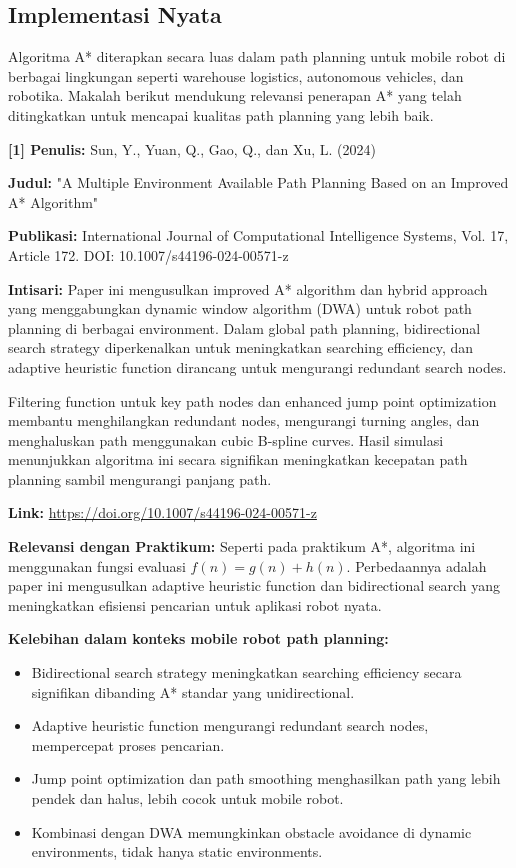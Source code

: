 \subsection{Implementasi Nyata}
Algoritma A* diterapkan secara luas dalam path planning untuk mobile robot di berbagai lingkungan seperti warehouse logistics, autonomous vehicles, dan robotika. Makalah berikut mendukung relevansi penerapan A* yang telah ditingkatkan untuk mencapai kualitas path planning yang lebih baik.

\vspace{1em}
\textbf{[1] Penulis:} Sun, Y., Yuan, Q., Gao, Q., dan Xu, L. (2024)

\textbf{Judul:} "A Multiple Environment Available Path Planning Based on an Improved A* Algorithm"

\textbf{Publikasi:} International Journal of Computational Intelligence Systems, Vol. 17, Article 172. DOI: 10.1007/s44196-024-00571-z

\textbf{Intisari:} Paper ini mengusulkan improved A* algorithm dan hybrid approach yang menggabungkan dynamic window algorithm (DWA) untuk robot path planning di berbagai environment. Dalam global path planning, bidirectional search strategy diperkenalkan untuk meningkatkan searching efficiency, dan adaptive heuristic function dirancang untuk mengurangi redundant search nodes.

Filtering function untuk key path nodes dan enhanced jump point optimization membantu menghilangkan redundant nodes, mengurangi turning angles, dan menghaluskan path menggunakan cubic B-spline curves. Hasil simulasi menunjukkan algoritma ini secara signifikan meningkatkan kecepatan path planning sambil mengurangi panjang path.

\textbf{Link:} \url{https://doi.org/10.1007/s44196-024-00571-z}

\vspace{1em}
\textbf{Relevansi dengan Praktikum:} Seperti pada praktikum A*, algoritma ini menggunakan fungsi evaluasi $f(n) = g(n) + h(n)$. Perbedaannya adalah paper ini mengusulkan adaptive heuristic function dan bidirectional search yang meningkatkan efisiensi pencarian untuk aplikasi robot nyata.

\vspace{1em}
\textbf{Kelebihan dalam konteks mobile robot path planning:}
\begin{itemize}
    \item Bidirectional search strategy meningkatkan searching efficiency secara signifikan dibanding A* standar yang unidirectional.
    \item Adaptive heuristic function mengurangi redundant search nodes, mempercepat proses pencarian.
    \item Jump point optimization dan path smoothing menghasilkan path yang lebih pendek dan halus, lebih cocok untuk mobile robot.
    \item Kombinasi dengan DWA memungkinkan obstacle avoidance di dynamic environments, tidak hanya static environments.
\end{itemize}

